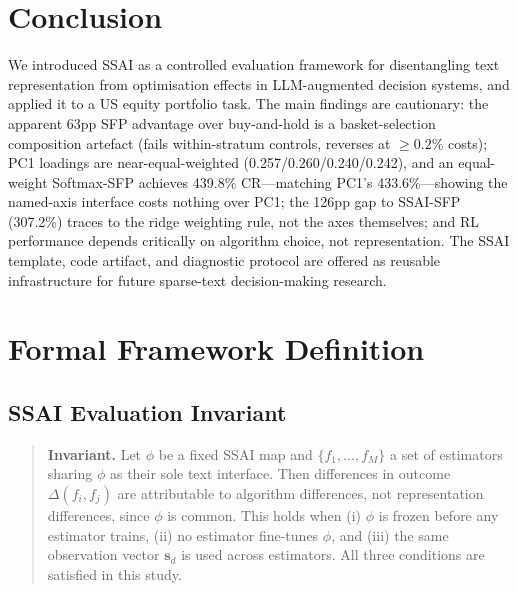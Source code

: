 \documentclass{article}
\begin{document}
\section{Conclusion}
\label{sec:conclusion}

We introduced SSAI as a controlled evaluation framework for disentangling text representation from optimisation effects in LLM-augmented decision systems, and applied it to a US equity portfolio task.
The main findings are cautionary: the apparent 63pp SFP advantage over buy-and-hold is a basket-selection composition artefact (fails within-stratum controls, reverses at ${\geq}0.2\%$ costs); PC1 loadings are near-equal-weighted (0.257/0.260/0.240/0.242), and an equal-weight Softmax-SFP achieves 439.8\% CR---matching PC1's 433.6\%---showing the named-axis interface costs nothing over PC1; the 126pp gap to SSAI-SFP (307.2\%) traces to the ridge weighting rule, not the axes themselves; and RL performance depends critically on algorithm choice, not representation.
The SSAI template, code artifact, and diagnostic protocol are offered as reusable infrastructure for future sparse-text decision-making research.
\label{p:endmaincontent}




\appendix

\section{Formal Framework Definition}
\label{app:ssai_def}

\subsection{SSAI Evaluation Invariant}
\label{app:invariant}

\begin{quote}
\textbf{Invariant.} Let $\phi$ be a fixed SSAI map and $\{f_1, \ldots, f_M\}$ a set of estimators sharing $\phi$ as their sole text interface. Then differences in outcome $\Delta(f_i, f_j)$ are attributable to algorithm differences, not representation differences, since $\phi$ is common. This holds when (i) $\phi$ is frozen before any estimator trains, (ii) no estimator fine-tunes $\phi$, and (iii) the same observation vector $\mathbf{s}_d$ is used across estimators. All three conditions are satisfied in this study.
\end{quote}
\end{document}
